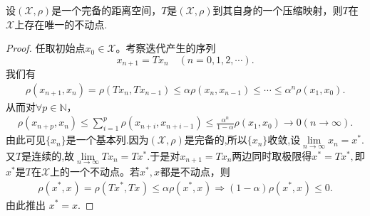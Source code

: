 \documentclass[../../main.tex]{subfiles}%
\begin{document}
\begin{theorem}\label{theorem:Banach不动点定理——压缩映象原理}
设$(\mathscr{X},\rho)$是一个完备的距离空间，$T$是$(\mathscr{X},\rho)$到其自身的一个压缩映射，则$T$在$\mathscr{X}$上存在唯一的不动点.
\end{theorem}
\begin{proof}
任取初始点$x_0 \in \mathscr{X}$。考察迭代产生的序列
$$x_{n+1} = Tx_n \quad (n = 0,1,2,\cdots).$$
我们有
\begin{align*}
\rho(x_{n+1}, x_n) = \rho(Tx_n, Tx_{n-1}) \leqslant \alpha \rho(x_n, x_{n-1}) \leqslant \cdots \leqslant \alpha^n \rho(x_1, x_0).
\end{align*}
从而对$\forall p \in \mathbb{N}$，
\begin{align*}
\rho(x_{n+p}, x_n) \leqslant \sum_{i=1}^p \rho(x_{n+i}, x_{n+i-1}) \leqslant \frac{\alpha^n}{1 - \alpha} \rho(x_1, x_0) \to 0(n \to \infty).
\end{align*}
由此可见$\{x_n\}$是一个基本列.因为$(\mathscr{X},\rho)$是完备的,所以$\{x_n\}$收敛,设$\underset{n\rightarrow \infty}{\lim}x_n=x^*.$又$T$是连续的,故$\underset{n\rightarrow \infty}{\lim}Tx_n=Tx^*.$于是对$x_{n+1} = Tx_n$两边同时取极限得$x^*=Tx^*,$即$x^*$是$T$在$\mathscr{X}$上的一个不动点。若$x^*, x^{ }$都是不动点，则
\begin{align*}
\rho \left( x^*,x^{ } \right) =\rho \left( Tx^*,Tx^{ } \right) \leqslant \alpha \rho \left( x^*,x^{ } \right) \Longrightarrow \left( 1-\alpha \right) \rho \left( x^*,x^{ } \right) \leqslant 0.
\end{align*}
由此推出
$x^* = x.$\end{proof}
\end{document}
